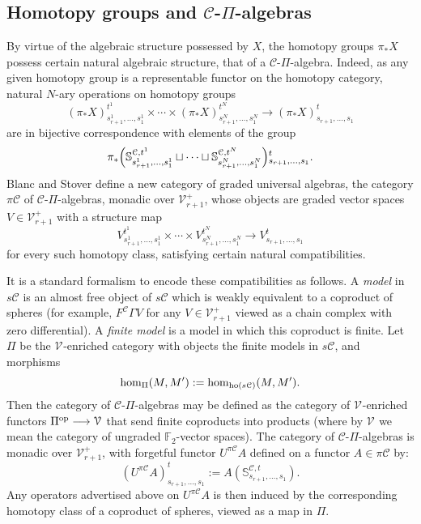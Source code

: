 \documentclass[11pt]{amsart} \renewcommand{\baselinestretch}{1.2}
\theoremstyle{plain}
\theoremstyle{definition}
\renewcommand{\to}{\longrightarrow}
\newcommand{\calV}{\mathcal{V}}
\newcommand{\calc}{\mathcal{C}}
\newcommand{\vect}[2]{\calV^{#1}_{#2}}
\newcommand{\PA}[1]{\pi#1}
\newcommand{\F}{\mathbb{F}}
\newcommand{\Ftwo}{\F_2}
\begin{document}
\begin{Pi-algebras and cohomology algebras}
\subsection{Homotopy groups and $\calc$-$\Pi$-algebras}\label{homotopy and pialgs}
By virtue of the algebraic structure possessed by $X$, the homotopy groups $\pi_*X$ possess certain natural algebraic structure, that of a $\calc$-$\Pi$-algebra. Indeed, as any given homotopy group is a representable functor on the homotopy category, natural $N$-ary operations on homotopy groups
\[(\pi_*X)_{s_{r+1}^{1},\ldots,s_{1}^{1}}^{t^1}\times\cdots \times(\pi_*X)_{s_{r+1}^{N},\ldots,s_{1}^{N}}^{t^N}\to (\pi_*X)_{s_{r+1},\ldots,s_{1}}^{t}\]
are in bijective correspondence with elements of the group
\[ \pi_*\Bigl(\mathbb{S}^{\calc,t^1}_{s_{r+1}^{1},\ldots,s_{1}^{1}}\sqcup\cdots\sqcup \mathbb{S}^{\calc,t^N}_{s_{r+1}^{N},\ldots,s_{1}^{N}}\Bigr)\makebox[0cm][l]{}_{s_{r+1},\ldots,s_{1}}^{t}.\]
Blanc and Stover \cite{Blanc_Stover-Groth_SS.pdf} define a new category of graded universal algebras, the category $\PA{\calc}$ of $\calc$-$\Pi$-algebras, monadic over $\vect{+}{r+1}$, whose objects are graded vector spaces $V\in\vect{+}{r+1}$ with a structure map 
\[V_{s_{r+1}^{1},\ldots,s_{1}^{1}}^{t^1}\times\cdots \times V_{s_{r+1}^{N},\ldots,s_{1}^{N}}^{t^N}\to V_{s_{r+1},\ldots,s_{1}}^{t}\]
for every such homotopy class, satisfying certain natural compatibilities.

It is a standard formalism to encode these compatibilities as follows. A \emph{model}  \cite{Blanc_Stover-Groth_SS.pdf} in $s\calc$ is 
an almost free object of $s\calc$ which is weakly equivalent to a coproduct of spheres (for example, $F^{\calc}\Gamma V$ for any $V\in\vect{+}{r+1}$ viewed as a chain complex with zero differential). A \emph{finite model} is a model in which this coproduct is finite. Let $\Pi$  be the $\vect{}{}$-enriched category with objects the finite models in $s\calc$, and morphisms
\[\hom_{\Pi}(M,M'):=\hom_{\textup{ho}(s\calc)}(M,M').\]
Then the category of $\calc$-$\Pi$-algebras  may be defined as the category of $\vect{}{}$-enriched functors $\Pi^\textup{op}\to \vect{}{}$ that send finite coproducts into products (where by $\vect{}{}$ we mean the category of ungraded $\Ftwo $-vector spaces). The category of $\calc$-$\Pi$-algebras is monadic over $\vect{+}{r+1}$, with  forgetful functor $U^{\PA{\calc}}A$ defined on a functor $A\in \PA{\calc}$ by:%
\[(U^{\PA{\calc}}A)^t_{s_{r+1},\ldots,s_1}:=A(\mathbb{S}^{\calc,t}_{s_{r+1},\ldots,s_{1}}).\]
Any operators advertised above on $U^{\PA{\calc}}A$ is then induced by the corresponding homotopy class of a coproduct of spheres, viewed as a map in $\Pi$. %


\end{Pi-algebras and cohomology algebras}
\end{document}

